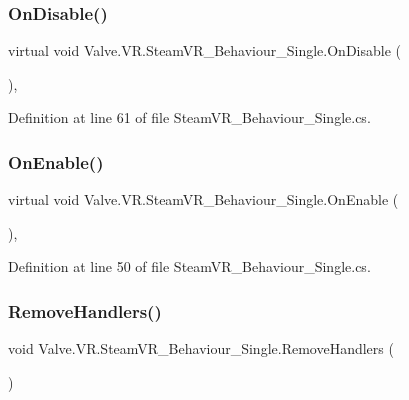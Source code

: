 \subsubsection{\texorpdfstring{OnDisable()}{OnDisable()}}
{\footnotesize\ttfamily virtual void Valve.\+V\+R.\+Steam\+V\+R\+\_\+\+Behaviour\+\_\+\+Single.\+On\+Disable (\begin{DoxyParamCaption}{ }\end{DoxyParamCaption})\hspace{0.3cm}{\ttfamily [protected]}, {\ttfamily [virtual]}}



Definition at line 61 of file Steam\+V\+R\+\_\+\+Behaviour\+\_\+\+Single.\+cs.

\mbox{\label{class_valve_1_1_v_r_1_1_steam_v_r___behaviour___single_a34136211e4b7c820b3a740654dc0b557}} 
\subsubsection{\texorpdfstring{OnEnable()}{OnEnable()}}
{\footnotesize\ttfamily virtual void Valve.\+V\+R.\+Steam\+V\+R\+\_\+\+Behaviour\+\_\+\+Single.\+On\+Enable (\begin{DoxyParamCaption}{ }\end{DoxyParamCaption})\hspace{0.3cm}{\ttfamily [protected]}, {\ttfamily [virtual]}}



Definition at line 50 of file Steam\+V\+R\+\_\+\+Behaviour\+\_\+\+Single.\+cs.

\mbox{\label{class_valve_1_1_v_r_1_1_steam_v_r___behaviour___single_a3bb2e5b7153fc7abb7b599748beca7c5}} 
\subsubsection{\texorpdfstring{RemoveHandlers()}{RemoveHandlers()}}
{\footnotesize\ttfamily void Valve.\+V\+R.\+Steam\+V\+R\+\_\+\+Behaviour\+\_\+\+Single.\+Remove\+Handlers (\begin{DoxyParamCaption}{ }\end{DoxyParamCaption})\hspace{0.3cm}{\ttfamily [protected]}}



